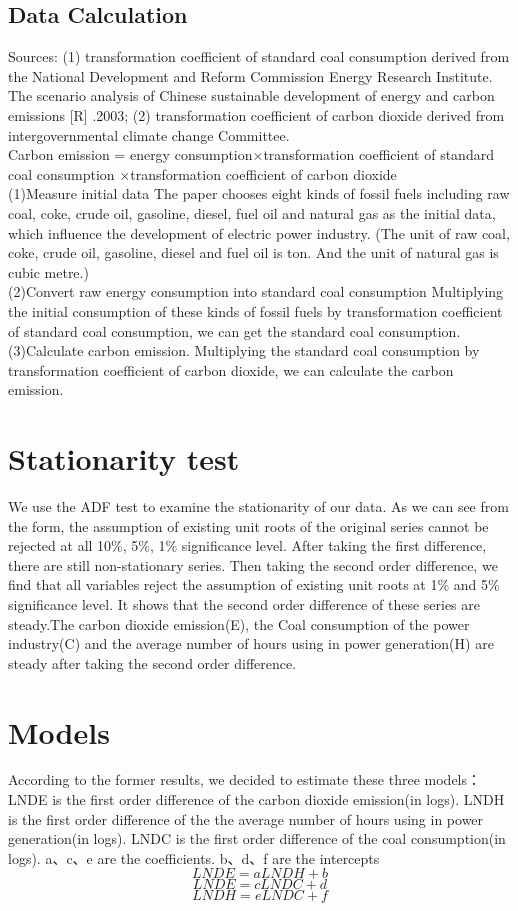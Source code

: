 \documentclass{article}
\begin{document}
      \subsection{ Data Calculation} Sources: (1) transformation coefficient of standard coal consumption derived from the National Development and Reform Commission Energy Research Institute. The scenario analysis of Chinese sustainable development of energy and carbon emissions [R] .2003; (2) transformation coefficient of carbon dioxide derived from intergovernmental climate change Committee.
\\Carbon emission = energy consumption×transformation coefficient of standard coal consumption ×transformation coefficient of carbon dioxide
\\(1)Measure initial data
The paper chooses eight kinds of fossil fuels including raw coal, coke, crude oil,	gasoline,	diesel,	fuel oil	and natural gas as the initial data, which influence the development of electric power industry. (The unit of raw coal, coke, crude oil,	gasoline,	diesel and	fuel oil is ton.	And the unit of natural gas is cubic metre.)
\\(2)Convert raw energy consumption into standard coal consumption
Multiplying the initial consumption of these kinds of fossil fuels by transformation coefficient of standard coal consumption, we can get the standard coal consumption.
\\(3)Calculate carbon emission.
Multiplying the standard coal consumption by transformation coefficient of carbon dioxide, we can calculate the carbon emission.
  \section{Stationarity test} We use the ADF test to examine the stationarity of our data. As we can see from the form,  the assumption of existing unit roots of the original series cannot be rejected at all 10\%, 5\%, 1\% significance level. After taking the first difference, there are still non-stationary series. Then taking the second order difference, we find that all variables reject the assumption of existing unit roots at 1\% and 5\% significance level. It shows that the second order difference of these series are steady.The carbon dioxide emission(E), the Coal consumption of the power industry(C) and the average number of hours using in power generation(H) are steady after taking the second order difference.
  \section{Models} According to the former results, we decided to estimate these three models：LNDE is the first order difference of the carbon dioxide emission(in logs). LNDH is the first order difference of the the average number of hours using in power generation(in logs). LNDC is the first order difference of the coal consumption(in logs). a、c、e are the coefficients. b、d、f are the intercepts
  $$LNDE=aLNDH+b$$
  $$LNDE=cLNDC+d$$
  $$LNDH=eLNDC+f$$
\end{document}
